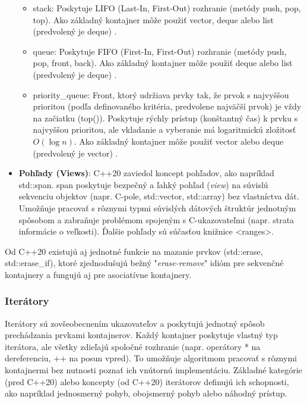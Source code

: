 \documentclass[11pt]{article}
\begin{document}
\begin{itemize}
  \begin{itemize}
      \item stack: Poskytuje LIFO (Last-In, First-Out) rozhranie (metódy push, pop, top). Ako základný kontajner môže použiť vector, deque alebo list (predvolený je deque) \cite{10162792}.
      \item queue: Poskytuje FIFO (First-In, First-Out) rozhranie (metódy push, pop, front, back). Ako základný kontajner môže použiť deque alebo list (predvolený je deque) \cite{10162792}.
      \item priority\_queue: Front, ktorý udržiava prvky tak, že prvok s najvyššou prioritou (podľa definovaného kritéria, predvolene najväčší prvok) je vždy na začiatku (top()). Poskytuje rýchly prístup (konštantný čas) k prvku s najvyššou prioritou, ale vkladanie a vyberanie má logaritmickú zložitosť $O(\log n)$. Ako základný kontajner môže použiť vector alebo deque (predvolený je vector) \cite{10162792}.
  \end{itemize}
  \item \textbf{Pohľady (Views)}: C++20 zaviedol koncept pohľadov, ako napríklad std::span. span poskytuje bezpečný a ľahký pohľad (\textit{view}) na súvislú sekvenciu objektov (napr. C-pole, std::vector, std::array) bez vlastníctva dát. Umožňuje pracovať s rôznymi typmi súvislých dátových štruktúr jednotným spôsobom a zabraňuje problémom spojeným s C-ukazovateľmi (napr. strata informácie o veľkosti). Ďalšie pohľady sú súčasťou knižnice <ranges>.
\end{itemize}

Od C++20 existujú aj jednotné funkcie na mazanie prvkov (std::erase, std::erase\_if), ktoré zjednodušujú bežný "\textit{erase-remove}" idióm pre sekvenčné kontajnery a fungujú aj pre asociatívne kontajnery.

\subsubsection{Iterátory}

Iterátory sú zovšeobecnením ukazovateľov a poskytujú jednotný spôsob prechádzania prvkami kontajnerov. Každý kontajner poskytuje vlastný typ iterátora, ale všetky zdieľajú spoločné rozhranie (napr. operátory * na dereferenciu, ++ na posun vpred). To umožňuje algoritmom pracovať s rôznymi kontajnermi bez nutnosti poznať ich vnútornú implementáciu. Základné kategórie (pred C++20) alebo koncepty (od C++20) iterátorov definujú ich schopnosti, ako napríklad jednosmerný pohyb, obojsmerný pohyb alebo náhodný prístup.
\end{document}
